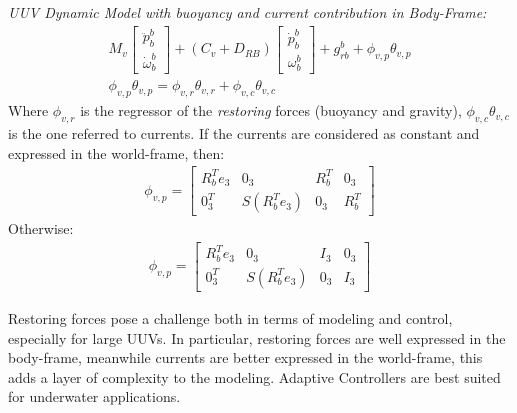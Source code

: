 \begin{definition}
    \textit{UUV Dynamic Model with buoyancy and current contribution in Body-Frame:}
    \begin{gather}
        M_v
        \begin{bmatrix}
            \ddot{p}_b^b\\ \dot{\omega}_b^b
        \end{bmatrix}+(C_v+D_{RB})
        \begin{bmatrix}
            \dot{p}_b^b\\ \omega_b^b
        \end{bmatrix}+g_{rb}^b+
        \phi_{v,p}\theta_{v,p}\\
        \phi_{v,p}\theta_{v,p}=\phi_{v,r}\theta_{v,r}+\phi_{v,c}\theta_{v,c}
    \end{gather}
    Where $\phi_{v,r}$ is the regressor of the \textit{restoring} forces (buoyancy and gravity), $\phi_{v,c}\theta_{v,c}$ is the one referred to currents. If the currents are considered as constant and expressed in the world-frame, then:
    \begin{gather*}
        \phi_{v,p}=\begin{bmatrix}
            R_b^Te_3 & 0_3 & R_b^T & 0_3 \\
            0_3^T & S(R_b^Te_3) & 0_3 & R_b^T
        \end{bmatrix}
    \end{gather*}
    Otherwise:
    \begin{gather*}
        \phi_{v,p}=\begin{bmatrix}
            R_b^Te_3 & 0_3 & I_3 & 0_3 \\
            0_3^T & S(R_b^Te_3) & 0_3 & I_3
        \end{bmatrix}
    \end{gather*}
\end{definition}
Restoring forces pose a challenge both in terms of modeling and control, especially for large UUVs. In particular, restoring forces are well expressed in the body-frame, meanwhile currents are better expressed in the world-frame, this adds a layer of complexity to the modeling. Adaptive Controllers are best suited for underwater applications.